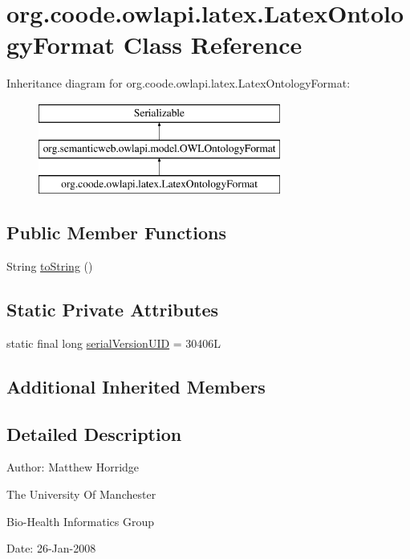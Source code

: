 \hypertarget{classorg_1_1coode_1_1owlapi_1_1latex_1_1_latex_ontology_format}{\section{org.\-coode.\-owlapi.\-latex.\-Latex\-Ontology\-Format Class Reference}
\label{classorg_1_1coode_1_1owlapi_1_1latex_1_1_latex_ontology_format}
}
Inheritance diagram for org.\-coode.\-owlapi.\-latex.\-Latex\-Ontology\-Format\-:\begin{figure}[H]
\begin{center}
\leavevmode
\includegraphics[height=3.000000cm]{classorg_1_1coode_1_1owlapi_1_1latex_1_1_latex_ontology_format}
\end{center}
\end{figure}
\subsection*{Public Member Functions}
\begin{DoxyCompactItemize}
\item 
String \hyperlink{classorg_1_1coode_1_1owlapi_1_1latex_1_1_latex_ontology_format_a95da83ed92bffbdf23dac03ee027c24e}{to\-String} ()
\end{DoxyCompactItemize}
\subsection*{Static Private Attributes}
\begin{DoxyCompactItemize}
\item 
static final long \hyperlink{classorg_1_1coode_1_1owlapi_1_1latex_1_1_latex_ontology_format_a3be06ed8e76c0c28890478b163ca8211}{serial\-Version\-U\-I\-D} = 30406\-L
\end{DoxyCompactItemize}
\subsection*{Additional Inherited Members}


\subsection{Detailed Description}
Author\-: Matthew Horridge\par
 The University Of Manchester\par
 Bio-\/\-Health Informatics Group\par
 Date\-: 26-\/\-Jan-\/2008\par
\par
 

